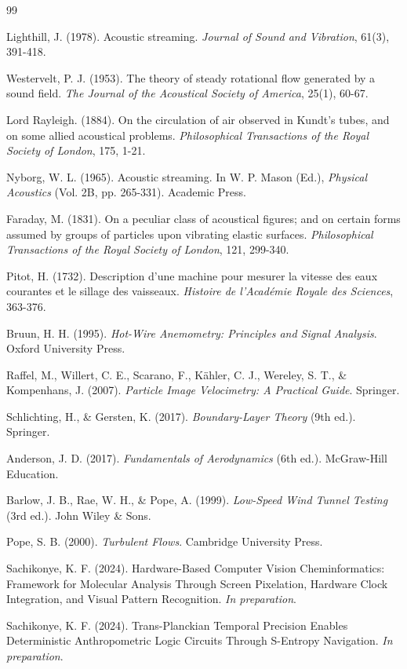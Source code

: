 \documentclass[12pt,a4paper]{article}
\begin{document}

\begin{thebibliography}{99}

Lighthill, J. (1978). Acoustic streaming. \textit{Journal of Sound and Vibration}, 61(3), 391-418.

Westervelt, P. J. (1953). The theory of steady rotational flow generated by a sound field. \textit{The Journal of the Acoustical Society of America}, 25(1), 60-67.

Lord Rayleigh. (1884). On the circulation of air observed in Kundt's tubes, and on some allied acoustical problems. \textit{Philosophical Transactions of the Royal Society of London}, 175, 1-21.

Nyborg, W. L. (1965). Acoustic streaming. In W. P. Mason (Ed.), \textit{Physical Acoustics} (Vol. 2B, pp. 265-331). Academic Press.

Faraday, M. (1831). On a peculiar class of acoustical figures; and on certain forms assumed by groups of particles upon vibrating elastic surfaces. \textit{Philosophical Transactions of the Royal Society of London}, 121, 299-340.

Pitot, H. (1732). Description d'une machine pour mesurer la vitesse des eaux courantes et le sillage des vaisseaux. \textit{Histoire de l'Académie Royale des Sciences}, 363-376.

Bruun, H. H. (1995). \textit{Hot-Wire Anemometry: Principles and Signal Analysis}. Oxford University Press.

Raffel, M., Willert, C. E., Scarano, F., Kähler, C. J., Wereley, S. T., \& Kompenhans, J. (2007). \textit{Particle Image Velocimetry: A Practical Guide}. Springer.

Schlichting, H., \& Gersten, K. (2017). \textit{Boundary-Layer Theory} (9th ed.). Springer.

Anderson, J. D. (2017). \textit{Fundamentals of Aerodynamics} (6th ed.). McGraw-Hill Education.

Barlow, J. B., Rae, W. H., \& Pope, A. (1999). \textit{Low-Speed Wind Tunnel Testing} (3rd ed.). John Wiley \& Sons.

Pope, S. B. (2000). \textit{Turbulent Flows}. Cambridge University Press.

Sachikonye, K. F. (2024). Hardware-Based Computer Vision Cheminformatics: Framework for Molecular Analysis Through Screen Pixelation, Hardware Clock Integration, and Visual Pattern Recognition. \textit{In preparation}.

Sachikonye, K. F. (2024). Trans-Planckian Temporal Precision Enables Deterministic Anthropometric Logic Circuits Through S-Entropy Navigation. \textit{In preparation}.

\end{thebibliography}
\end{document}
